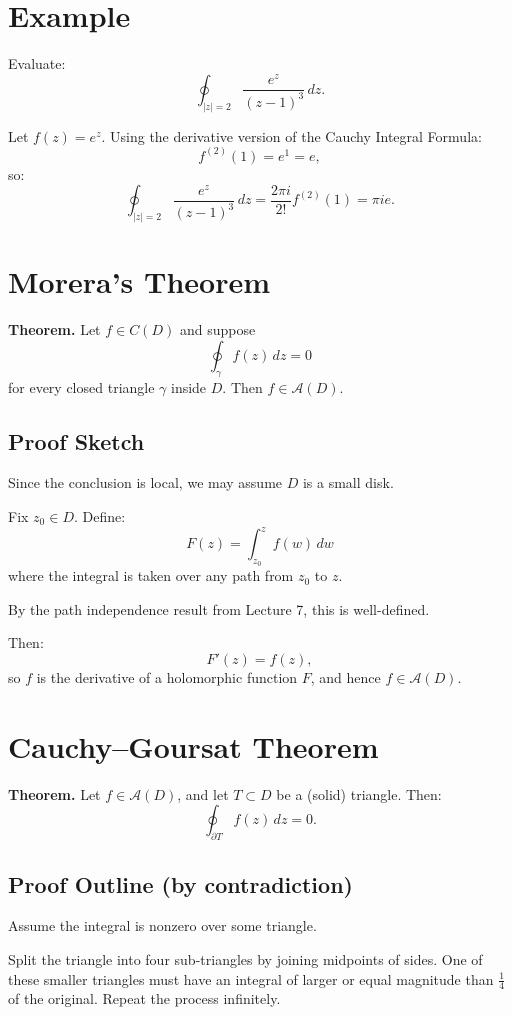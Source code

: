 \documentclass[12pt]{article}
\theoremstyle{definition} %
\theoremstyle{plain} %
\begin{document}
\section*{Example}

Evaluate:
\[
\oint_{|z| = 2} \frac{e^z}{(z - 1)^3}\,dz.
\]

Let $f(z) = e^z$. Using the derivative version of the Cauchy Integral Formula:
\[
f^{(2)}(1) = e^1 = e,
\]
so:
\[
\oint_{|z| = 2} \frac{e^z}{(z - 1)^3}\,dz = \frac{2\pi i}{2!} f^{(2)}(1) = \pi i e.
\]

\section*{Morera's Theorem}

\textbf{Theorem.} Let $f \in C(D)$ and suppose
\[
\oint_{\gamma} f(z)\,dz = 0
\]
for every closed triangle $\gamma$ inside $D$. Then $f \in \mathcal{A}(D)$.

\subsection*{Proof Sketch}

Since the conclusion is local, we may assume $D$ is a small disk.

Fix $z_0 \in D$. Define:
\[
F(z) = \int_{z_0}^z f(w)\,dw
\]
where the integral is taken over any path from $z_0$ to $z$.

By the path independence result from Lecture 7, this is well-defined.

Then:
\[
F'(z) = f(z),
\]
so $f$ is the derivative of a holomorphic function $F$, and hence $f \in \mathcal{A}(D)$.

\section*{Cauchy–Goursat Theorem}

\textbf{Theorem.} Let $f \in \mathcal{A}(D)$, and let $T \subset D$ be a (solid) triangle. Then:
\[
\oint_{\partial T} f(z)\,dz = 0.
\]

\subsection*{Proof Outline (by contradiction)}

Assume the integral is nonzero over some triangle.

Split the triangle into four sub-triangles by joining midpoints of sides. One of these smaller triangles must have an integral of larger or equal magnitude than $\frac{1}{4}$ of the original. Repeat the process infinitely.
\end{document}
